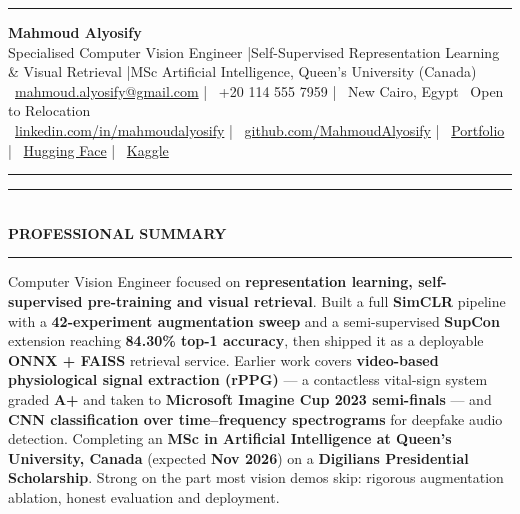 \documentclass[10pt, a4paper]{article}
\newcommand{\faEnvelope}{}\newcommand{\faPhone}{}\newcommand{\faMapMarker}{}%
\newcommand{\faLinkedin}{}\newcommand{\faGithub}{}\newcommand{\faRobot}{}%
\newcommand{\faChartBar}{}\newcommand{\faGlobe}{}%
\newcommand{\cvsection}[1]{%
  \vspace{3pt}%
  {\color{navy}\rule{\linewidth}{1.1pt}}\\[0.5pt]%
  {\color{navy}\bfseries\fontsize{9.5}{11}\selectfont\uppercase{#1}}\\[-4pt]%
  {\color{teal}\rule{\linewidth}{0.6pt}}%
  \vspace{2pt}%
}
\begin{document}
\small

{\color{navy}\rule{\linewidth}{1.5pt}}

\vspace{3pt}
\begin{center}
  {\fontsize{21}{24}\bfseries\color{navy} Mahmoud Alyosify}\\[3pt]
  {\fontsize{10}{12}\color{teal}
    Specialised Computer Vision Engineer \enspace|\enspace Self-Supervised Representation Learning \& Visual Retrieval
    \enspace|\enspace MSc Artificial Intelligence, Queen's University (Canada)
}\\[4pt]
  {\color{midgray}
    \faEnvelope\ \href{mailto:mahmoud.alyosify@gmail.com}{mahmoud.alyosify@gmail.com}
    \enspace|\enspace
    \faPhone\ +20 114 555 7959
    \enspace|\enspace
    \faMapMarker\ New Cairo, Egypt \textperiodcentered\ Open to Relocation}\\[2pt]
  {\faLinkedin\ \href{https://linkedin.com/in/mahmoudalyosify}{linkedin.com/in/mahmoudalyosify}
    \enspace|\enspace
    \faGithub\ \href{https://github.com/MahmoudAlyosify}{github.com/MahmoudAlyosify}
    \enspace|\enspace
    \faGlobe\ \href{https://mahmoudalyosifysite.github.io/}{Portfolio}
    \enspace|\enspace
    \faRobot\ \href{https://huggingface.co/mahmoudalyosify}{Hugging Face}
    \enspace|\enspace
    \faChartBar\ \href{https://kaggle.com/mahmoudalyosify}{Kaggle}}
\end{center}

{\color{navy}\rule{\linewidth}{1.5pt}}

\vspace{2pt}

\cvsection{Professional Summary}

{\color{darkgray}\justifying
Computer Vision Engineer focused on \textbf{representation learning, self-supervised pre-training and visual retrieval}. Built a full \textbf{SimCLR} pipeline with a \textbf{42-experiment augmentation sweep} and a semi-supervised \textbf{SupCon} extension reaching \textbf{84.30\% top-1 accuracy}, then shipped it as a deployable \textbf{ONNX + FAISS} retrieval service. Earlier work covers \textbf{video-based physiological signal extraction (rPPG)} --- a contactless vital-sign system graded \textbf{A+} and taken to \textbf{Microsoft Imagine Cup 2023 semi-finals} --- and \textbf{CNN classification over time--frequency spectrograms} for deepfake audio detection. Completing an \textbf{MSc in Artificial Intelligence at Queen's University, Canada} (expected \textbf{Nov 2026}) on a \textbf{Digilians Presidential Scholarship}. Strong on the part most vision demos skip: rigorous augmentation ablation, honest evaluation and deployment.}
\end{document}
